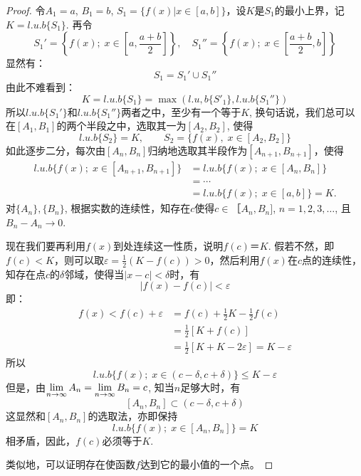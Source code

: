 \begin{proof}
令$A_1=a$, $B_1=b$, $S_1=\{f(x)|x\in [a,b]\}$，设$K$是$S_1$的最小上界，记$K=l.u.b\{S_1\}$. 再令
\[S_1'=\left\{f (x) ; \; x\in \left[a,\frac{a+b}{2}\right]\right\},\quad S_1''=\left\{f(x);\; x\in\left[\frac{a+b}{2},b\right]\right\}\]
显然有：
\[S_1=S_1'\cup S_1''\]
由此不难看到：
\[K=l.u.b \{S_1\} =\max \left(l.u,b \{S'_1\} ,l.u.b\{S_1''\}\right)\]
所以$l.u.b\{S_1'\}$和$l.u.b\{S_1''\}$两者之中，至少有一个等于$K$, 换句话说，我们总可以在$[A_1,B_1]$的两个半段之中，选取其一为$[A_2,B_2]$, 使得
\[l.u.b \{S_2\} =K,\qquad  S_2= \{f (x) ,\; x\in [A_2, B_2] \}\] 
如此逐步二分，每次由$[A_{n} ,B_{n}]$归纳地选取其半段作为$[A_{n+1} ,B_{n+1}]$，使得
\[\begin{split}
    l.u.b \{f (x) ;\; x\in  [A_{n+1}, B_{n+1}] \}&=l.u.b \{f (x) ;\; x\in [A_n, B_n] \}\\
&=\cdots\\
&=l.u.b \{f (x) ;\; x\in  [a,b] \}=K.
\end{split}\]
对$\{A_n\},\{B_n \}$, 根据实数的连续性，知存在$c$使得$c\in ［A_n,B_n]$, $n=1, 2, 3,\ldots$, 且$B_n-A_n\to 0$.

现在我们要再利用$f(x)$到处连续这一性质，说明$f(c)＝K$. 假若不然，即$f(c)<K$，则可以取$\varepsilon=\frac{1}{2}(K-f(c))>0$，然后利用$f(x)$在$c$点的连续性，知存在点$c$的$\delta$邻域，使得当$|x-c|<\delta$时，有
\[|f(x)-f(c)|<\varepsilon\]
即：
\[\begin{split}
    f(x)<f(c)+\varepsilon&=f(c)+\frac{1}{2}K-\frac{1}{2}f(c)\\
    &=\frac{1}{2}[K+f(c)]\\
    &=\frac{1}{2}[K+K-2\varepsilon]=K-\varepsilon
\end{split}\]
所以
\[l.u.b \{f (x) ;\; x\in  (c-\delta,c+\delta) \} \le K-\varepsilon\]
但是，由$\displaystyle\lim_{n\to\infty} A_n=\displaystyle\lim_{n\to\infty}B_n=c$, 知当$n$足够大时，有
\[[A_n,B_n]\subset (c-\delta,c+\delta)\]
这显然和$[A_n,B_n]$的选取法，亦即保持
\[l.u.b \{f (x) ;\; x\in [A_n,B_n]\}=K\]
相矛盾，因此，$f(c)$必须等于$K$. 

类似地，可以证明存在使函数$f$达到它的最小值的一个点。
\end{proof}

